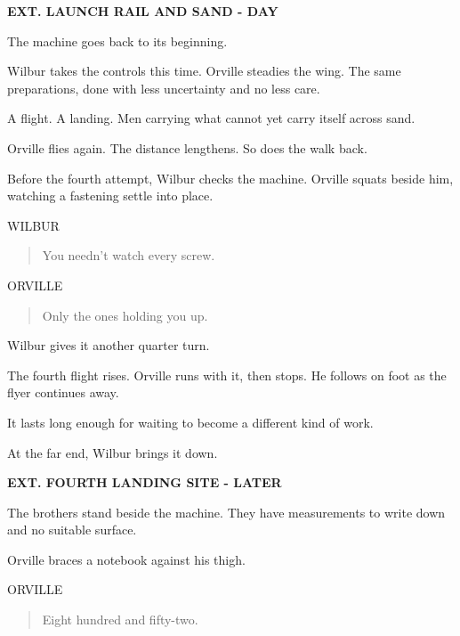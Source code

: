 \documentclass[12pt,letterpaper]{article}
\newcommand{\scene}[1]{\needspace{5\baselineskip}\vspace{8pt}\textbf{#1}\par}
\newcommand{\character}[1]{\needspace{4\baselineskip}\hspace*{2.2in}#1\par\nopagebreak}
\begin{document}
\scene{EXT. LAUNCH RAIL AND SAND - DAY}

The machine goes back to its beginning.\par

Wilbur takes the controls this time. Orville steadies the wing. The same preparations, done with less uncertainty and no less care.\par

A flight. A landing. Men carrying what cannot yet carry itself across sand.\par

Orville flies again. The distance lengthens. So does the walk back.\par

Before the fourth attempt, Wilbur checks the machine. Orville squats beside him, watching a fastening settle into place.\par

\character{WILBUR}
\begin{quote}You needn't watch every screw.\par\end{quote}

\character{ORVILLE}
\begin{quote}Only the ones holding you up.\par\end{quote}

Wilbur gives it another quarter turn.\par

The fourth flight rises. Orville runs with it, then stops. He follows on foot as the flyer continues away.\par

It lasts long enough for waiting to become a different kind of work.\par

At the far end, Wilbur brings it down.\par

\scene{EXT. FOURTH LANDING SITE - LATER}

The brothers stand beside the machine. They have measurements to write down and no suitable surface.\par

Orville braces a notebook against his thigh.\par

\character{ORVILLE}
\begin{quote}Eight hundred and fifty-two.\par\end{quote}
\end{document}
